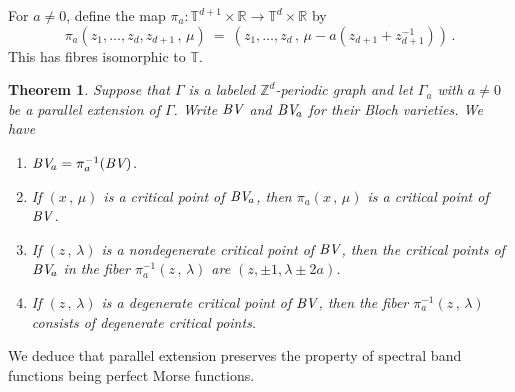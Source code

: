 \documentclass[12pt]{amsart}
\newtheorem{Theorem}{Theorem}[section]
\theoremstyle{remark}
\newcommand{\RR}{{\mathbb R}}
\newcommand{\TT}{{\mathbb T}}
\newcommand{\ZZ}{{\mathbb Z}}
\newcommand{\BV}{{\textit{BV}}\hspace{0.5pt}}
\begin{document}
For $a\neq 0$, define the map $\pi_a\colon \TT^{d+1}\times\RR \to \TT^d\times\RR$ by
\[
   \pi_a(z_1,\dotsc,z_d, z_{d+1}\,,\, \mu)\ =\ (z_1,\dotsc,z_d\,,\, \mu-a(z_{d+1} + z_{d+1}^{-1}))\,.
\]
This has fibres isomorphic to $\TT$.
   

\begin{Theorem}\label{Thm:Parallel_Critical}
  Suppose that $\Gamma$ is a labeled $\ZZ^d$-periodic graph and let $\Gamma_a$ with $a\neq 0$ be a parallel extension of\/ $\Gamma$.
  Write $\BV$ and $\BV\!_a$ for their Bloch varieties.
  We have
  \begin{enumerate}
    \item $\BV\!_a=\pi_a^{-1}(\BV)$.

    \item If $(x\,,\,\mu)$ is a critical point of $\BV\!_a$, then $\pi_a(x\,,\,\mu)$ is a critical point of $\BV$.

    \item If $(z\,,\,\lambda)$ is a nondegenerate critical point of $\BV$, then the critical points of $\BV\!_a$ in the fiber
           $\pi_a^{-1}(z\,,\,\lambda)$  are $(z,\pm1,\lambda\pm2a)$.

    \item If $(z\,,\,\lambda)$ is a degenerate critical point of $\BV$, then  the fiber $\pi_a^{-1}(z\,,\,\lambda)$
      consists of degenerate  critical points.

  \end{enumerate}
\end{Theorem}

We deduce that parallel extension preserves the property of spectral band functions being perfect Morse functions.
\end{document}
